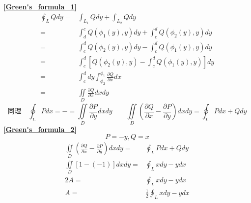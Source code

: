 \textbf{\large \ref{Green's_formula_1}}
\begin{align*}
	\oint_LQdy=&\int_{L_1}Qdy+\int_{L_2}Qdy\\
	=&\int_{d}^{c}Q(\phi_1(y),y)dy+\int_{c}^{d}Q(\phi_2(y),y)dy\\
	=&\int_{c}^{d}Q(\phi_2(y),y)dy-\int_{c}^{d}Q(\phi_1(y),y)dy\\
	=&\int_{c}^{d}\left[Q(\phi_2(y),y)-\int_{c}^{d}Q(\phi_1(y),y)\right]dy\\
	=&\int_{c}^{d}dy\int_{\phi_2}^{\phi_1}\frac{\partial Q}{\partial x}dx\\
	=&\iint\limits_D\frac{\partial Q}{\partial x}dxdy
\end{align*}
$$\mbox{同理}\quad\oint_LPdx=-=\iint\limits_D\frac{\partial P}{\partial y}dxdy\qquad\iint\limits_{D}\left(\frac{\partial Q}{\partial x}-\frac{\partial P}{\partial y}\right)dxdy=\oint_{L}Pdx+Qdy$$
\textbf{\large \ref{Green's_formula_2}}
	$$P=-y,Q=x$$
\begin{align*}
	\iint\limits_{D}\left(\frac{\partial Q}{\partial x}-\frac{\partial P}{\partial y}\right)dxdy=&\oint_{L}Pdx+Qdy\\
	\iint\limits_{D}\left[1-(-1)\right]dxdy=&\oint_{L}xdy-ydx\\
	2A=&\oint_{L}xdy-ydx\\
	A=&\frac{1}{2}\oint_{L}xdy-ydx
\end{align*}